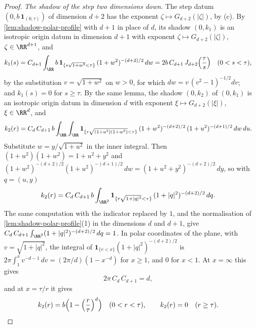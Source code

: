 \begin{proof}
\emph{The shadow of the step two dimensions down.} The step datum
$(0, b\,\mathbf 1_{(0,\tau)})$ of dimension $d + 2$ has the exponent
$\zeta \mapsto G_{d+2}(|\zeta|)$, by (c). By \ref{lem:shadow-polar-profile} with $d + 1$ in place
of $d$, its shadow $(0,k_1)$ is an isotropic origin datum in dimension $d + 1$ with exponent
$\zeta \mapsto G_{d+2}(|\zeta|)$, $\zeta \in \RR^{d+1}$, and
\[
  k_1(s) = C_{d+1}\int_{\RR} b\,\mathbf 1_{\{s\sqrt{1+w^2} < \tau\}}\,(1+w^2)^{-(d+2)/2}\,dw
         = 2b\,C_{d+1}\,J_{d+2}\Bigl(\frac{\tau}{s}\Bigr) \quad (0 < s < \tau),
\]
by the substitution $v = \sqrt{1+w^2}$ on $w > 0$, for which $dw = v\,(v^2-1)^{-1/2}dv$; and
$k_1(s) = 0$ for $s \ge \tau$. By the same lemma, the shadow $(0,k_2)$ of $(0,k_1)$ is an
isotropic origin datum in dimension $d$ with exponent $\xi \mapsto G_{d+2}(|\xi|)$,
$\xi \in \RR^d$, and
\[
  k_2(r) = C_d\,C_{d+1}\,b\int_{\RR}\int_{\RR}
     \mathbf 1_{\{r\sqrt{(1+u^2)(1+w^2)} < \tau\}}\,(1+w^2)^{-(d+2)/2}\,(1+u^2)^{-(d+1)/2}\,dw\,du .
\]
Substitute $w = y/\sqrt{1+u^2}$ in the inner integral. Then $(1+u^2)(1+w^2) = 1 + u^2 + y^2$ and
$(1+w^2)^{-(d+2)/2}(1+u^2)^{-(d+1)/2}\,dw = (1+u^2+y^2)^{-(d+2)/2}\,dy$, so with $q = (u,y)$
\[
  k_2(r) = C_d\,C_{d+1}\,b\int_{\RR^2}\mathbf 1_{\{r\sqrt{1+|q|^2} < \tau\}}\,
     (1+|q|^2)^{-(d+2)/2}\,dq .
\]
The same computation with the indicator replaced by $1$, and the normalisation of
\ref{lem:shadow-polar-profile}(1) in the dimensions $d$ and $d + 1$, give
$C_d\,C_{d+1}\int_{\RR^2}(1+|q|^2)^{-(d+2)/2}\,dq = 1$. In polar coordinates of the plane, with
$v = \sqrt{1+|q|^2}$, the integral of $\mathbf 1_{\{v < x\}}(1+|q|^2)^{-(d+2)/2}$ is
$2\pi\int_1^x v^{-d-1}\,dv = (2\pi/d)(1 - x^{-d})$ for $x \ge 1$, and $0$ for $x < 1$. At
$x = \infty$ this gives
\begin{equation}\label{eq:shadow-constants}
  2\pi\,C_d\,C_{d+1} = d ,
\end{equation}
and at $x = \tau/r$ it gives
\[
  k_2(r) = b\Bigl(1 - \Bigl(\frac{r}{\tau}\Bigr)^{d}\Bigr) \quad (0 < r < \tau), \qquad
  k_2(r) = 0 \quad (r \ge \tau) .
\]


\end{proof}
